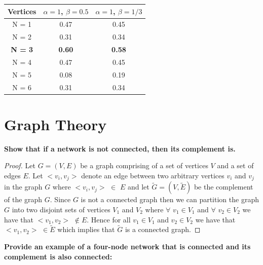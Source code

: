 \documentclass[a4paper]{article}
\begin{document}
\begin{table}[ht!]
	\centering
	 \label{tab:title} 
	\begin{tabular}{ccc}
		\hline
		
		Vertices & $\alpha = 1$, $\beta = 0.5$ & $\alpha = 1$, $\beta = 1/3$\\
		\hline\hline
		N = 1 & 0.47  &  0.45 \\ 
		N = 2 & 0.31  & 0.34 \\
		\textbf{{\color{blue} N = 3}} & \textbf{{\color{blue} 0.60}} &  \textbf{{\color{blue} 0.58}} \\
		N = 4 & 0.47 & 0.45 \\
		N = 5 & 0.08 & 0.19 \\
		N = 6 & 0.31 & 0.34 \\
		
		\bottomrule[1pt]
	\end{tabular}
\end{table}

\vspace{3cm}

\section*{Graph Theory}

\noindent\textbf{{\color{blue} Show that if a network is not connected, then its complement is.}}

\begin{proof}
	Let $G = (V,E)$ be a graph comprising of a set of vertices $V$ and a set of edges $E$. Let $<v_i, v_j>$ denote an edge between two arbitrary vertices $v_i$ and $v_j$ in the graph $G$ where  $<v_i, v_j>$ $\in$ $E$ and let $\tilde{G} = (V,\tilde{E})$ be the complement of the graph $G$. Since $G$ is not a connected graph then we can partition the graph $G$ into two disjoint sets of vertices $V_1$ and $V_2$ where $\forall$ $v_1 \in V_1$ and $\forall$ $v_2 \in V_2$ we have that $<v_1,v_2>$ $\notin E$. Hence for all $v_1\in V_1$ and $v_2\in V_2$ we have that $<v_1, v_2>$ $ \in \tilde{E}$ which implies that $\tilde{G}$ is a connected graph. 
\end{proof}



\noindent\textbf{{\color{blue} Provide an example of a four-node network that is connected and its complement is also connected:}}
\end{document}

